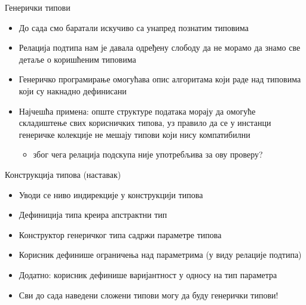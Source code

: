 \documentclass[xcolor=table]{beamer}
\begin{document}
    \begin{frame}{Генерички типови}
        \begin{itemize}
            \item До сада смо баратали искучиво са унапред познатим типовима
            \item Релација подтипа нам је давала одређену слободу да не морамо да знамо све детаље о коришћеним типовима
            \item Генеричко програмирање омогућава опис алгоритама који раде над типовима који су накнадно дефинисани
            \item Најчешћа примена: опште структуре података морају да омогуће складиштење свих корисничких типова, уз правило да се у инстанци генеричке колекције не мешају типови који нису компатибилни
            \begin{itemize}
                \item због чега релација подскупа није употребљива за ову проверу?
            \end{itemize}
        \end{itemize}
    \end{frame}

    \begin{frame}{Конструкција типова (наставак)}
        \begin{itemize}
            \item Уводи се ниво индирекције у конструкцији типова
            \item Дефиниција типа креира апстрактни тип
            \item Конструктор генеричког типа садржи параметре типова
            \item Корисник дефинише ограничења над параметрима (у виду релације подтипа)
            \item Додатно: корисник дефинише варијантност у односу на тип параметра
            \item Сви до сада наведени сложени типови могу да буду генерички типови!
        \end{itemize}
    \end{frame}
\end{document}
